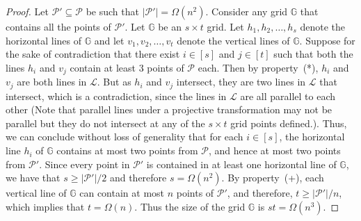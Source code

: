 \documentclass[10pt,a4paper]{amsart}
\begin{document}
\begin{proof}
	Let $\mathcal{P}'\subseteq\mathcal{P}$ be such that $|\mathcal{P}'|=\Omega(n^2)$. Consider any grid $\mathbb{G}$ that contains all the points of $\mathcal{P}'$. Let $\mathbb{G}$ be an $s\times t$ grid. Let $h_1,h_2,\ldots,h_s$ denote the horizontal lines of $\mathbb{G}$ and let $v_1,v_2,\ldots,v_t$ denote the vertical lines of $\mathbb{G}$. Suppose for the sake of contradiction that there exist $i\in [s]$ and $j\in [t]$ such that both the lines $h_i$ and $v_j$ contain at least 3 points of $\mathcal{P}$ each. Then by property~(*), $h_i$ and $v_j$ are both lines in $\mathcal{L}$. But as $h_i$ and $v_j$ intersect, they are two lines in $\mathcal{L}$ that intersect, which is a contradiction, since the lines in $\mathcal{L}$ are all parallel to each other (Note that parallel lines under a projective transformation may not be parallel but they do not intersect at any of the $s\times t$ grid points defined.). Thus, we can conclude without loss of generality that for each $i\in [s]$, the horizontal line $h_i$ of $\mathbb{G}$ contains at most two points from $\mathcal{P}$, and hence at most two points from $\mathcal{P}'$. Since every point in $\mathcal{P}'$ is contained in at least one horizontal line of $\mathbb{G}$, we have that $s\geq |\mathcal{P}'|/2$ and therefore $s=\Omega(n^2)$. By property~(+), each vertical line of $\mathbb{G}$ can contain at most $n$ points of $\mathcal{P}'$, and therefore, $t\geq |\mathcal{P}'|/n$, which implies that $t=\Omega(n)$. Thus the size of the grid $\mathbb{G}$ is $st=\Omega(n^3)$.
\end{proof}
\end{document}
